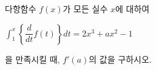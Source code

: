 다항함수 $f(x)$가 모든 실수 $x$에 대하여 \par\smallskip\noindent\hspace*{1.5em}$\displaystyle\int_{1}^{x} \left\{\dfrac{d}{dt}f(t)\right\}dt=2x^3+ax^2-1$\par\smallskip\noindent 을 만족시킬 때, $f'(a)$의 값을 구하시오. 
